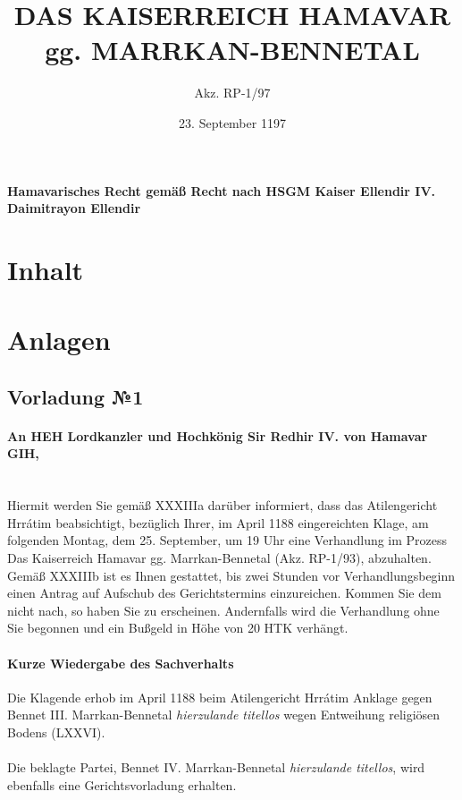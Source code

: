 \documentclass{article}
\title{DAS KAISERREICH HAMAVAR gg. MARRKAN-BENNETAL}
\author{Akz. RP-1/97}
\date{23. September 1197}
\begin{document}
\maketitle
\vspace*{\fill}
\paragraph{Hamavarisches Recht gemäß Recht nach HSGM Kaiser Ellendir IV. Daimitrayon Ellendir}
\newpage
\section{Inhalt}
\section{Anlagen}
\subsection{Vorladung №1}
\paragraph{An HEH Lordkanzler und Hochkönig Sir Redhir IV. von Hamavar GIH,\\\\}
Hiermit werden Sie gemäß XXXIIIa darüber informiert, dass das Atilengericht Hrrátim beabsichtigt, bezüglich Ihrer, 
im April 1188 eingereichten Klage, am folgenden Montag, dem 25. September, um 19 Uhr eine Verhandlung im Prozess Das Kaiserreich Hamavar gg.
Marrkan-Bennetal (Akz. RP-1/93), abzuhalten.\\
Gemäß XXXIIIb ist es Ihnen gestattet, bis zwei Stunden vor Verhandlungsbeginn einen Antrag auf Aufschub des Gerichtstermins einzureichen.
Kommen Sie dem nicht nach, so haben Sie zu erscheinen. Andernfalls wird die Verhandlung ohne Sie begonnen und ein Bußgeld in Höhe von 20
HTK verhängt.
\paragraph{Kurze Wiedergabe des Sachverhalts\\}
Die Klagende erhob im April 1188 beim Atilengericht Hrrátim Anklage gegen Bennet III. Marrkan-Bennetal \textit{hierzulande titellos} wegen Entweihung religiösen Bodens
(LXXVI).\\\\
Die beklagte Partei, Bennet IV. Marrkan-Bennetal \textit{hierzulande titellos}, wird ebenfalls eine Gerichtsvorladung erhalten.\\
\end{document}
